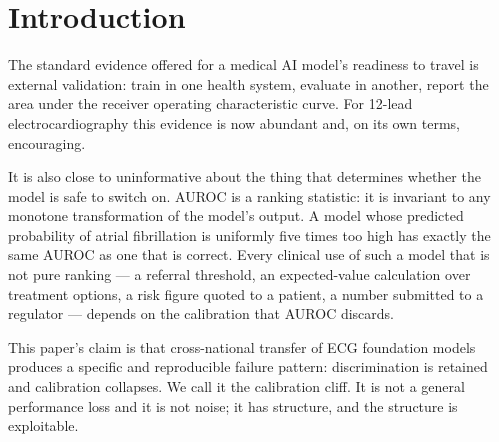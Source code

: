 \documentclass[11pt]{article}
\theoremstyle{plain}
\theoremstyle{definition}
\theoremstyle{remark}
\begin{document}
\begin{abstract}
We then answer the question deployment actually turns on: how many labeled
target recordings a new hospital needs.  We prove complementary upper and lower
bounds that partition the problem at an explicit threshold --- a site whose
residual concept shift falls within its calibration budget needs \emph{zero}
labels, and above that threshold no procedure escapes an inverse-square rate ---
together with a sample-size formula whose constant is the model's mean
predictive variance on the target site, computable before any labeling.  A companion result extends
conformal prediction sets to remain valid under bounded concept shift.  We
release \texttt{recalib-kit}, which computes all of this from per-bin
sufficient statistics, so a site whose data cannot leave its institution can
still participate.
\end{abstract}

\section{Introduction}
\label{sec:intro}

The standard evidence offered for a medical AI model's readiness to travel is
external validation: train in one health system, evaluate in another, report
the area under the receiver operating characteristic curve.  For 12-lead
electrocardiography this evidence is now abundant and, on its own terms,
encouraging.

It is also close to uninformative about the thing that determines whether the
model is safe to switch on.  AUROC is a ranking statistic: it is invariant to
any monotone transformation of the model's output.  A model whose predicted
probability of atrial fibrillation is uniformly five times too high has exactly
the same AUROC as one that is correct.  Every clinical use of such a model that
is not pure ranking --- a referral threshold, an expected-value calculation
over treatment options, a risk figure quoted to a patient, a number submitted
to a regulator --- depends on the calibration that AUROC discards.

This paper's claim is that cross-national transfer of ECG foundation models
produces a specific and reproducible failure pattern: discrimination is
retained and calibration collapses.  We call it the calibration cliff.  It is
not a general performance loss and it is not noise; it has structure, and the
structure is exploitable.
\end{document}
